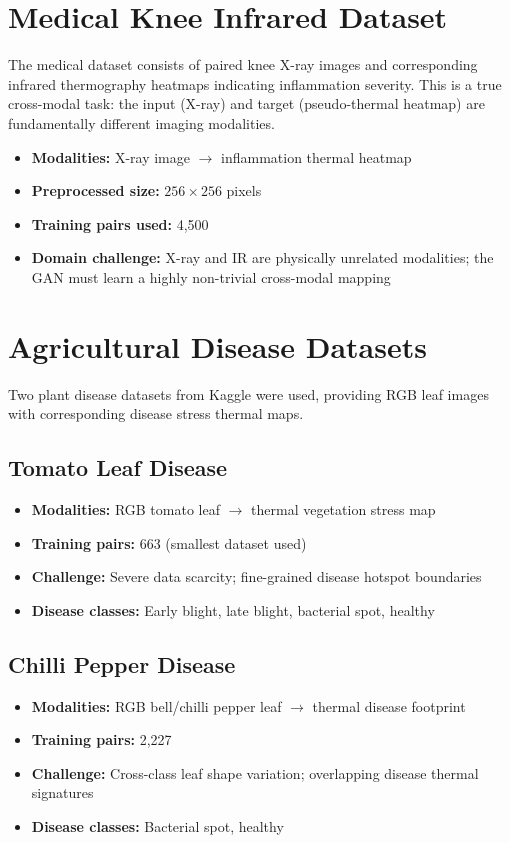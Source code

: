 \section{Medical Knee Infrared Dataset}

The medical dataset consists of paired knee X-ray images and corresponding infrared thermography heatmaps indicating inflammation severity. This is a true cross-modal task: the input (X-ray) and target (pseudo-thermal heatmap) are fundamentally different imaging modalities.

\begin{itemize}
    \item \textbf{Modalities:} X-ray image $\to$ inflammation thermal heatmap
    \item \textbf{Preprocessed size:} $256 \times 256$ pixels
    \item \textbf{Training pairs used:} 4,500
    \item \textbf{Domain challenge:} X-ray and IR are physically unrelated modalities; the GAN must learn a highly non-trivial cross-modal mapping
\end{itemize}

\section{Agricultural Disease Datasets}

Two plant disease datasets from Kaggle were used, providing RGB leaf images with corresponding disease stress thermal maps.

\subsection{Tomato Leaf Disease}
\begin{itemize}
    \item \textbf{Modalities:} RGB tomato leaf $\to$ thermal vegetation stress map
    \item \textbf{Training pairs:} 663 (smallest dataset used)
    \item \textbf{Challenge:} Severe data scarcity; fine-grained disease hotspot boundaries
    \item \textbf{Disease classes:} Early blight, late blight, bacterial spot, healthy
\end{itemize}

\subsection{Chilli Pepper Disease}
\begin{itemize}
    \item \textbf{Modalities:} RGB bell/chilli pepper leaf $\to$ thermal disease footprint
    \item \textbf{Training pairs:} 2,227
    \item \textbf{Challenge:} Cross-class leaf shape variation; overlapping disease thermal signatures
    \item \textbf{Disease classes:} Bacterial spot, healthy
\end{itemize}

